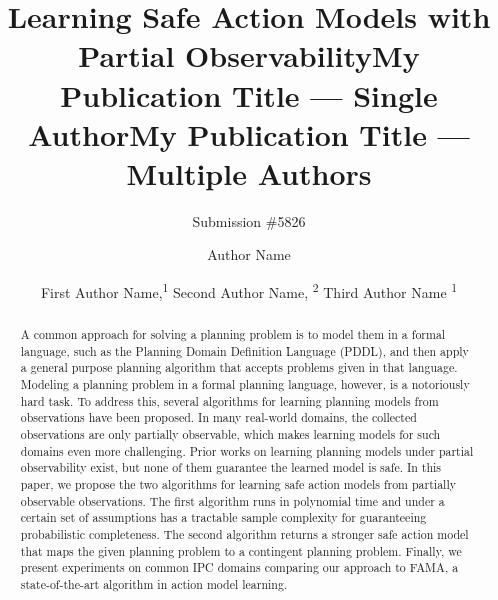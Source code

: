 \documentclass[letterpaper]{article} %
\title{Learning Safe Action Models with Partial Observability}
\author{Submission \#5826}
\title{My Publication Title --- Single Author}
\author {
    Author Name
}
\title{My Publication Title --- Multiple Authors}
\author {
    First Author Name,\textsuperscript{\rm 1}
    Second Author Name, \textsuperscript{\rm 2}
    Third Author Name \textsuperscript{\rm 1}
}
\begin{document}
\maketitle

\begin{abstract}




A common approach for solving a planning problem is to model them in a formal language, such as the Planning Domain Definition Language (PDDL), and then apply a general purpose planning algorithm that accepts problems given in that language. Modeling a planning problem in a formal planning language, however, is a notoriously hard task. To address this, several algorithms for learning planning models from observations have been proposed. In many real-world domains, the collected observations are only partially observable, which makes learning models for such domains even more challenging. Prior works on learning planning models under partial observability exist, but none of them guarantee the learned model is safe. In this paper, we propose the two algorithms for learning safe action models from partially observable observations. The first algorithm runs in polynomial time and under a certain set of assumptions has a tractable sample complexity for guaranteeing probabilistic completeness. The second algorithm returns a stronger safe action model that maps the given planning problem to a contingent planning problem. Finally, we present experiments on common IPC domains comparing our approach to FAMA, a state-of-the-art algorithm in action model learning. 


\end{abstract}
\end{document}
